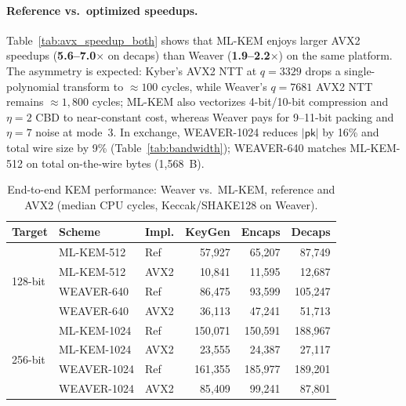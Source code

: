 \paragraph{Reference vs.\ optimized speedups.}
Table~\ref{tab:avx_speedup_both} shows that ML-KEM enjoys larger AVX2 speedups
(\textbf{5.6--7.0$\times$} on decaps) than Weaver
(\textbf{1.9--2.2$\times$}) on the same platform.
The asymmetry is expected: Kyber's AVX2 NTT at $q{=}3329$ drops a single-polynomial
transform to $\approx{}100$ cycles, while Weaver's $q{=}7681$ AVX2 NTT remains
$\approx{}1{,}800$ cycles; ML-KEM also vectorizes 4-bit/10-bit compression and
$\eta{=}2$ CBD to near-constant cost, whereas Weaver pays for 9--11-bit packing
and $\eta{=}7$ noise at mode~3.
In exchange, \textsc{WEAVER-1024} reduces $|\mathsf{pk}|$ by 16\% and total
wire size by 9\% (Table~\ref{tab:bandwidth}); \textsc{WEAVER-640} matches
ML-KEM-512 on total on-the-wire bytes (1{,}568~B).

\begin{table}[t]
\centering
\caption{End-to-end KEM performance: Weaver vs.\ ML-KEM, reference and AVX2
        (median CPU cycles, Keccak/SHAKE128 on Weaver).}
\label{tab:kem_fourway}
\renewcommand{\arraystretch}{1.12}
\small
\begin{tabular}{lllrrr}
\toprule
\textbf{Target} & \textbf{Scheme} & \textbf{Impl.} & \textbf{KeyGen} & \textbf{Encaps} & \textbf{Decaps} \\
\midrule
\multirow{4}{*}{128-bit}
  & ML-KEM-512   & Ref  & 57{,}927 & 65{,}207 & 87{,}749 \\
  & ML-KEM-512   & AVX2 & 10{,}841 & 11{,}595 & 12{,}687 \\
  & \textsc{WEAVER-640} & Ref  & 86{,}475 & 93{,}599 & 105{,}247 \\
  & \textsc{WEAVER-640} & AVX2 & 36{,}113 & 47{,}241 & 51{,}713 \\
\midrule
\multirow{4}{*}{256-bit}
  & ML-KEM-1024  & Ref  & 150{,}071 & 150{,}591 & 188{,}967 \\
  & ML-KEM-1024  & AVX2 & 23{,}555 & 24{,}387 & 27{,}117 \\
  & \textsc{WEAVER-1024} & Ref  & 161{,}355 & 185{,}977 & 189{,}201 \\
  & \textsc{WEAVER-1024} & AVX2 & 85{,}409 & 99{,}241 & 87{,}801 \\
\bottomrule
\end{tabular}
\end{table}

